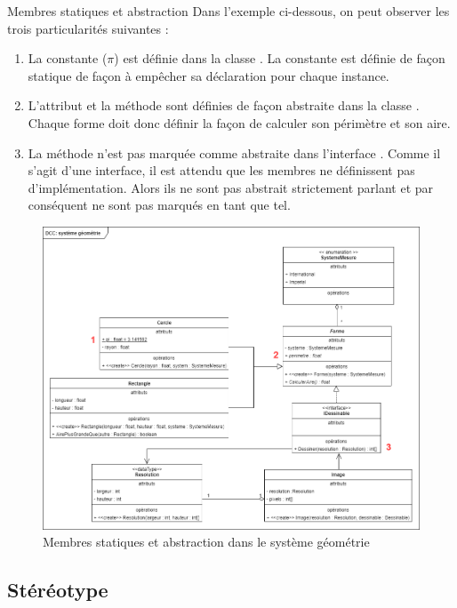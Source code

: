 \begin{exemple}{Membres statiques et abstraction}
	Dans l'exemple ci-dessous, on peut observer les trois particularités suivantes :
	\begin{enumerate}
		\item La constante  ($\pi$) est définie dans la classe . La constante est définie de façon statique de façon à empêcher sa déclaration pour chaque instance.
		\item L'attribut  et la méthode  sont définies de façon abstraite dans la classe . Chaque forme doit donc définir la façon de calculer son périmètre et son aire.
		\item La méthode  n'est pas marquée comme abstraite dans l'interface . Comme il s'agit d'une interface, il est attendu que les membres ne définissent pas d'implémentation. Alors ils ne sont pas abstrait strictement parlant et par conséquent ne sont pas marqués en tant que tel.
	\end{enumerate}
	
	\begin{figure}[H]
		\caption{Membres statiques et abstraction dans le système géométrie}
		\centering
		\includegraphics[scale=0.45]{dcc-rect-stat-abs.png}
	\end{figure}
\end{exemple}

\subsection{Stéréotype}
\label{ssec:dcc-stereotype}

